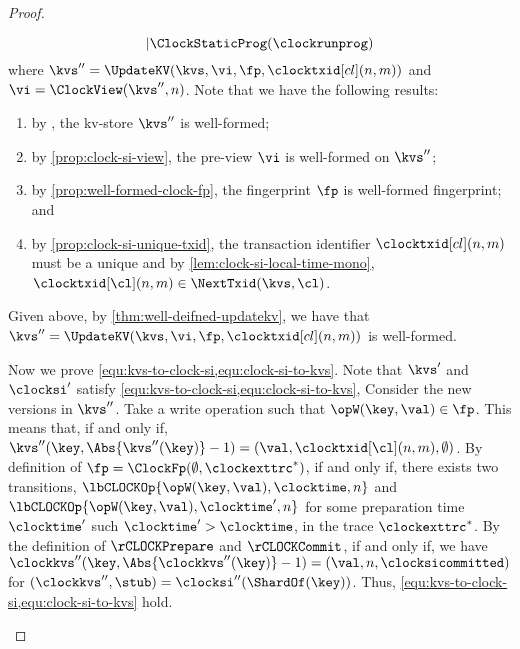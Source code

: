 \begin{proof}
\begin{enumerate}
\begin{enumerate}
\[{                                       | \ClockStaticProg(\clockrunprog) }
        \]
        where \( \kvs'' = \UpdateKV(\kvs,\vi,\fp,\clocktxid[cl](n,m)) \) and \( \vi = \ClockView(\kvs'',n) \).
        Note that we have the following results:
        \begin{enumerate}
            \item by \ih, the kv-store \( \kvs'' \) is well-formed;
            \item by \cref{prop:clock-si-view}, the pre-view \( \vi \) is well-formed on \( \kvs'' \);
            \item by \cref{prop:well-formed-clock-fp}, the fingerprint \( \fp \) is well-formed fingerprint; and 
            \item by \cref{prop:clock-si-unique-txid}, the transaction identifier \( \clocktxid[cl](n,m) \) must be a unique 
            and by \cref{lem:clock-si-local-time-mono}, \( \clocktxid[\cl](n,m) \in \NextTxid(\kvs,\cl) \).
        \end{enumerate}
        Given above, by \cref{thm:well-deifned-updatekv},
        we have that \( \kvs'' = \UpdateKV(\kvs,\vi,\fp,\clocktxid[cl](n,m)) \) is well-formed.
        
        Now we prove \cref{equ:kvs-to-clock-si,equ:clock-si-to-kvs}.
        Note that \( \kvs' \) and \( \clocksi' \) satisfy \cref{equ:kvs-to-clock-si,equ:clock-si-to-kvs},
        Consider the new versions in \( \kvs'' \).      
        Take a write operation such that \( \opW(\key,\val) \in \fp \).
        This means that, if and only if, \( \kvs''(\key,\Abs{\kvs''(\key)} - 1 ) = (\val,\clocktxid[\cl](n,m),\emptyset) \).
        By definition of \( \fp = \ClockFp(\emptyset,\clockexttrc^*) \),
        if and only if, there exists two transitions, 
        \( \lbCLOCKOp{\opW(\key,\val),\clocktime,n} \) and \( \lbCLOCKOp{\opW(\key,\val),\clocktime',n} \) 
        for some preparation time \( \clocktime' \) such \( \clocktime' > \clocktime\),
        in the trace \( \clockexttrc^*\).
        By the definition of \( \rCLOCKPrepare \) and \( \rCLOCKCommit \),
        if and only if, we have \( \clockkvs''(\key, \Abs{\clockkvs''(\key)} - 1)  = (\val,n,\clocksicommitted) \)
        for \( (\clockkvs'',\stub) = \clocksi''(\ShardOf(\key))\).
        Thus, \cref{equ:kvs-to-clock-si,equ:clock-si-to-kvs} hold. \qedhere


\end{enumerate}
\end{enumerate}
\end{proof}
